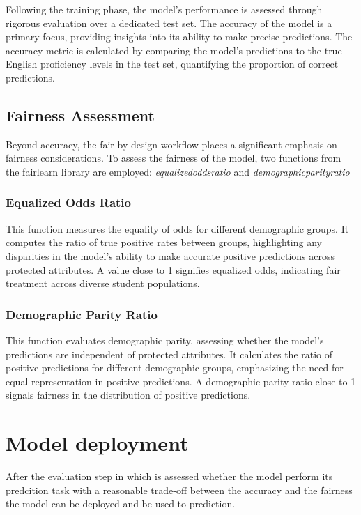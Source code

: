 \documentclass[12pt,a4paper,openright,twoside]{book}
\begin{document}
Following the training phase, the model's performance is assessed through rigorous evaluation over a dedicated test set. The accuracy of the model is a primary focus, providing insights into its ability to make precise predictions. The accuracy metric is calculated by comparing the model's predictions to the true English proficiency levels in the test set, quantifying the proportion of correct predictions.

\subsection{Fairness Assessment}

Beyond accuracy, the fair-by-design workflow places a significant emphasis on fairness considerations. To assess the fairness of the model, two functions from the fairlearn library are employed: \emph{equalized\textunderscore odds\textunderscore ratio} and \emph{demographic\textunderscore parity\textunderscore ratio}

\subsubsection{Equalized Odds Ratio}

This function measures the equality of odds for different demographic groups. It computes the ratio of true positive rates between groups, highlighting any disparities in the model's ability to make accurate positive predictions across protected attributes. A value close to 1 signifies equalized odds, indicating fair treatment across diverse student populations.

\subsubsection{Demographic Parity Ratio}

This function evaluates demographic parity, assessing whether the model's predictions are independent of protected attributes. It calculates the ratio of positive predictions for different demographic groups, emphasizing the need for equal representation in positive predictions. A demographic parity ratio close to 1 signals fairness in the distribution of positive predictions.

\section{Model deployment}
After the evaluation step in which is assessed whether the model perform its predcition task with a reasonable trade-off between the accuracy and the fairness the model can be deployed and be used to prediction.
\end{document}

